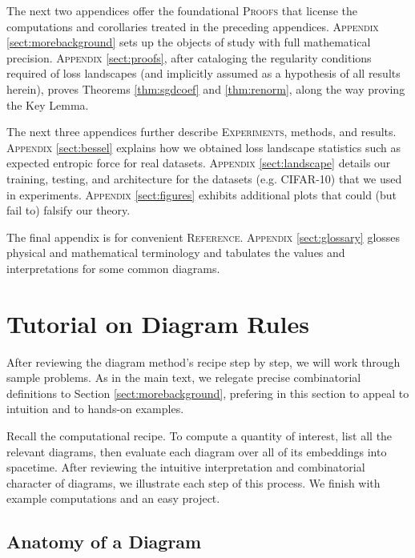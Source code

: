 \documentclass{article}
\theoremstyle{plain}
\theoremstyle{definition}
\begin{document}
    The next two appendices offer the foundational \textsc{Proofs} that
    license the computations and corollaries treated in the preceding
    appendices.
    \textsc{Appendix} \ref{sect:morebackground} sets up the objects of study
        with full mathematical precision.
    \textsc{Appendix} \ref{sect:proofs}, after cataloging the regularity
        conditions required of loss landscapes (and implicitly assumed as a
        hypothesis of all results herein), proves Theorems \ref{thm:sgdcoef}
        and \ref{thm:renorm}, along the way proving the Key Lemma.

    The next three appendices further describe \textsc{Experiments}, methods,
    and results.
    \textsc{Appendix} \ref{sect:bessel} explains how we obtained loss landscape
        statistics such as expected entropic force for real datasets.
    \textsc{Appendix} \ref{sect:landscape} details our training, testing, and
        architecture for the datasets (e.g. CIFAR-10) that we used in
        experiments.
    \textsc{Appendix} \ref{sect:figures} exhibits additional plots that could
        (but fail to) falsify our theory.

    The final appendix is for convenient \textsc{Reference}.
    \textsc{Appendix} \ref{sect:glossary} glosses physical and mathematical
        terminology and tabulates the values and interpretations for some
        common diagrams.

\section{Tutorial on Diagram Rules} \label{sect:tutorial}

    After reviewing the diagram method's recipe step by step, we will work
    through sample problems.  As in the main text, we
    relegate precise combinatorial definitions to Section
    \ref{sect:morebackground}, prefering in this section to appeal to intuition
    and to hands-on examples.

    Recall the computational recipe.  To compute a quantity of interest, list
    all the relevant diagrams, then evaluate each diagram over all of its
    embeddings into spacetime.  After reviewing the intuitive interpretation
    and combinatorial character of diagrams, we illustrate each step of this
    process.  We finish with example computations and an easy project.

    \subsection{Anatomy of a Diagram}
\end{document}
